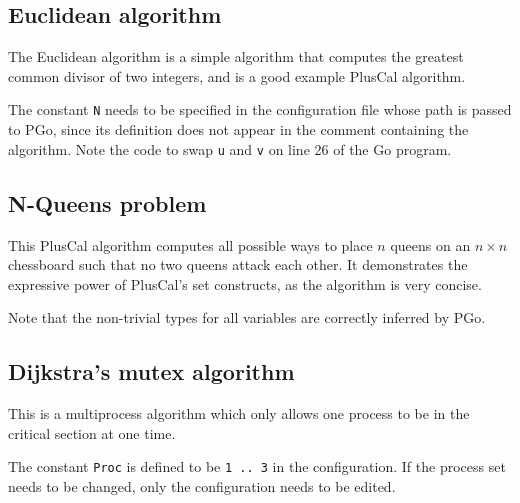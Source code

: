 \subsection{Euclidean algorithm}
The Euclidean algorithm is a simple algorithm that computes the greatest common divisor of two integers, and is a good example PlusCal algorithm.





The constant \lstinline[language=pcal]|N| needs to be specified in the configuration file whose path is passed to PGo, since its definition does not appear in the comment containing the algorithm. Note the code to swap \lstinline[language=pcal]|u| and \lstinline[language=pcal]|v| on line 26 of the Go program.

\subsection{N-Queens problem}
This PlusCal algorithm computes all possible ways to place $n$ queens on an $n \times n$ chessboard such that no two queens attack each other. It demonstrates the expressive power of PlusCal's set constructs, as the algorithm is very concise.





Note that the non-trivial types for all variables are correctly inferred by PGo.

\subsection{Dijkstra's mutex algorithm}
This is a multiprocess algorithm which only allows one process to be in the critical section at one time.





The constant \lstinline[language=pcal]|Proc| is defined to be \lstinline[language=pcal]|1 .. 3| in the configuration. If the process set needs to be changed, only the configuration needs to be edited.
